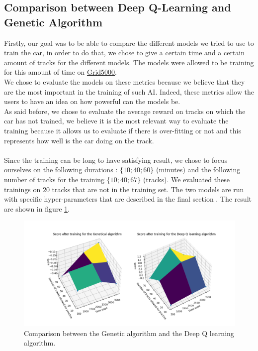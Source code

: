 \documentclass[11pt,a4paper]{article}
\newcounter{fig}
\begin{document}
		\subsection*{Comparison between Deep Q-Learning and Genetic Algorithm}
Firstly, our goal was to be able to compare the different models we tried to use to train the car, in order to do that, we chose to give a certain time and a certain amount of tracks for the different models. The models were allowed to be training for this amount of time on \href{https://www.grid5000.fr}{Grid5000}.\\
We chose to evaluate the models on these metrics because we believe that they are the most important in the training of such AI. Indeed, these metrics allow the users to have an idea on how powerful can the models be.\\
As said before, we chose to evaluate the average reward on tracks on which the car has not trained, we believe it is the most relevant way to evaluate the training because it allows us to evaluate if there is over-fitting or not 
and this represents how well is the car doing on the track.\\
\\
Since the training can be long to have satisfying result, we chose to focus ourselves on the following durations : $\{10;40;60\}$ (minutes) and the following number of tracks for the training $\{10;40;67\}$ (tracks). We evaluated these trainings on $20$ tracks that are not in the training set. The two models are run with specific hyper-parameters that are described in the final section \pageref{Hyperparameters}. 
The result are shown in figure \ref{figure:compare GA VS DQ}.
        \begin{figure}[ht]
            \centering
            \includegraphics[scale = 0.65]{graphe_comparaison.png}
            \caption{Comparison between the Genetic algorithm and the Deep Q learning algorithm.}
            \label{figure:compare GA VS DQ}
        \end{figure}
\end{document}
